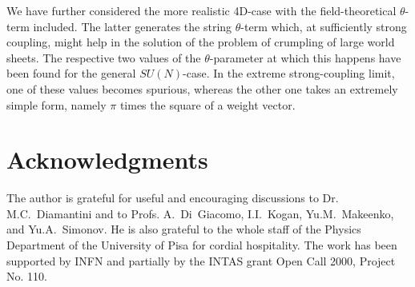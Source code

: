 \documentclass[a4paper,12pt]{article}
\begin{document}
We have further considered the more realistic 4D-case with the field-theoretical
$\theta$-term included. The latter generates the string $\theta$-term which, at sufficiently strong coupling, might help in the solution
of the problem of crumpling of large world sheets. The respective two values of the $\theta$-parameter at which this happens
have been found for the general $SU(N)$-case. In the extreme strong-coupling limit, one of these values becomes spurious, whereas the
other one takes an extremely simple form, namely $\pi$ times the square of a weight vector.





\section{Acknowledgments}

The author is grateful for useful and encouraging discussions to Dr. M.C.~Diamantini and to Profs. A.~Di~Giacomo,
I.I.~Kogan, Yu.M.~Makeenko, and Yu.A.~Simonov.
He is also grateful to
the whole staff of the Physics Department of the
University of Pisa for cordial hospitality.
The work has been supported by INFN and partially by
the INTAS grant Open Call 2000, Project No. 110.
\end{document}
